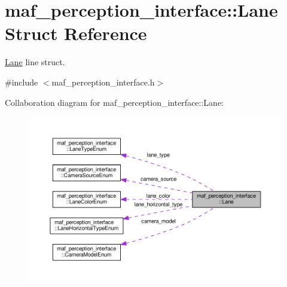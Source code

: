 \hypertarget{structmaf__perception__interface_1_1Lane}{}\section{maf\+\_\+perception\+\_\+interface\+:\+:Lane Struct Reference}
\label{structmaf__perception__interface_1_1Lane}


\hyperlink{structmaf__perception__interface_1_1Lane}{Lane} line struct.  




{\ttfamily \#include $<$maf\+\_\+perception\+\_\+interface.\+h$>$}



Collaboration diagram for maf\+\_\+perception\+\_\+interface\+:\+:Lane\+:\nopagebreak
\begin{figure}[H]
\begin{center}
\leavevmode
\includegraphics[width=350pt]{structmaf__perception__interface_1_1Lane__coll__graph}
\end{center}
\end{figure}
